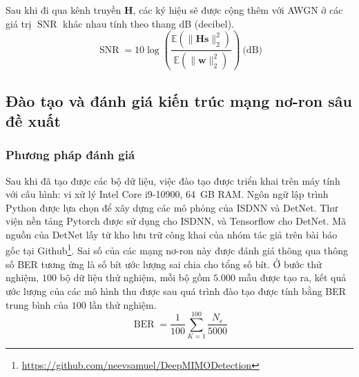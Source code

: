 Sau khi đi qua kênh truyền $\mathbf{H}$, các ký hiệu sẽ được cộng thêm với AWGN ở các giá trị $\operatorname{SNR}$ khác nhau tính theo thang dB (decibel). 
\begin{equation}
\operatorname{SNR} = 10 \log \left(\frac{\mathbb{E}\left(\|\mathbf{H s}\|_2^2\right)}{\mathbb{E}\left(\|\mathbf{w}\|_2^2\right)}\right)~\text{(dB)}
\end{equation}

\subsection{Đào tạo và đánh giá kiến trúc mạng nơ-ron sâu đề xuất}

\subsubsection{Phương pháp đánh giá}

Sau khi đã tạo được các bộ dữ liệu, việc đào tạo được triển khai trên máy tính với cấu hình: vi xử lý Intel Core i9-10900, 64~GB RAM. Ngôn ngữ lập trình Python được lựa chọn để xây dựng các mô phỏng của ISDNN và DetNet. Thư viện nền tảng Pytorch được sử dụng cho ISDNN, và Tensorflow cho DetNet. Mã nguồn của DetNet lấy từ kho lưu trữ công khai của nhóm tác giả trên bài báo gốc tại Github\footnote{\url{https://github.com/neevsamuel/DeepMIMODetection}}. Sai số của các mạng nơ-ron này được đánh giá thông qua thông số BER tương ứng là số bít ước lượng sai chia cho tổng số bít. Ở bước thử nghiệm, $100$ bộ dữ liệu thử nghiệm, mỗi bộ gồm $5.000$ mẫu được tạo ra, kết quả ước lượng của các mô hình thu được sau quá trình đào tạo được tính bằng BER trung bình của $100$ lần thử nghiệm.
\begin{equation}
    \operatorname{BER} = \frac{1}{100} \sum_{K=1}^{100} \frac{N_e}{5000}
\end{equation}

